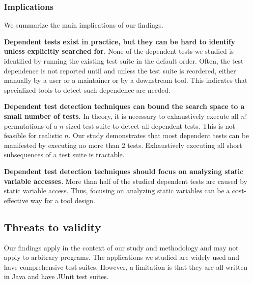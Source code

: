 \subsubsection{Implications}

We summarize the main implications of our findings.

\noindent \textbf{{Dependent tests exist in practice, but
they can be hard to identify unless explicitly searched for.}}
None of the dependent tests we studied is identified by
running the existing test suite in the default order. Often,
the test dependence is not reported until and unless the
test suite is reordered, either manually by a user or
a maintainer or by a downstream tool. This indicates that
specialized tools to detect such dependence are needed.

\vspace{1mm}
\noindent \textbf{Dependent test detection techniques
can bound the search space to a small number of tests.}
In theory, it is necessary
to exhaustively execute all $n!$ permutations of a $n$-sized
test suite to detect all dependent tests. This is
not feasible for realistic $n$.  Our study demonstrates that
most dependent tests can be manifested by executing
no more than 2 tests.  Exhaustively executing all 
short subsequences of a test suite is tractable.

\vspace{1mm}
\noindent \textbf{Dependent test detection techniques
should focus on analyzing static variable accesses.}
More than half of the studied dependent tests are caused
by static variable access. Thus, focusing on analyzing
static variables can be a cost-effective way for a
tool design. 





\subsection{Threats to validity}

Our findings apply in the context of our study and methodology and may not
apply to arbitrary programs.
The applications we studied are widely used and have comprehensive test suites.
However, a limitation is that they are all written in 
Java and have JUnit test suites.  

